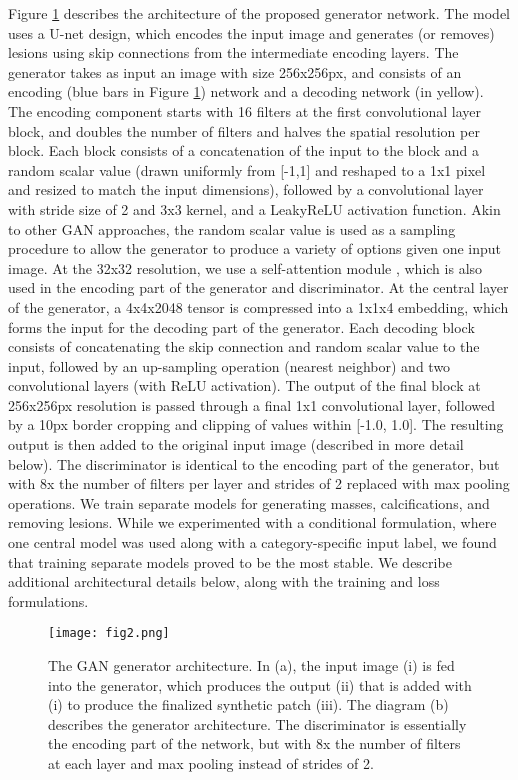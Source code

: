 \documentclass{article}
\begin{document}
Figure \ref{architecture} describes the architecture of the proposed generator network. The model uses a U-net \cite{unet} design, which encodes the input image and generates (or removes) lesions using skip connections from the intermediate encoding layers. The generator takes as input an image with size 256x256px, and consists of an encoding (blue bars in Figure \ref{architecture}) network and a decoding network (in yellow). The encoding component starts with 16 filters at the first convolutional layer block, and doubles the number of filters and halves the spatial resolution per block. Each block consists of a concatenation of the input to the block and a random scalar value (drawn uniformly from [-1,1] and reshaped to a 1x1 pixel and resized to match the input dimensions), followed by a convolutional layer with stride size of 2 and 3x3 kernel, and a LeakyReLU \cite{xu} activation function. Akin to other GAN approaches, the random scalar value is used as a sampling procedure to allow the generator to produce a variety of options given one input image. At the 32x32 resolution, we use a self-attention module \cite{sagan}, which is also used in the encoding part of the generator and discriminator. At the central layer of the generator, a 4x4x2048 tensor is compressed into a 1x1x4 embedding, which forms the input for the decoding part of the generator. Each decoding block consists of concatenating the skip connection and random scalar value to the input, followed by an up-sampling operation (nearest neighbor) and two convolutional layers (with ReLU activation). The output of the final block at 256x256px resolution is passed through a final 1x1 convolutional layer, followed by a 10px border cropping and clipping of values within [-1.0, 1.0]. The resulting output is then added to the original input image (described in more detail below). The discriminator is identical to the encoding part of the generator, but with 8x the number of filters per layer and strides of 2 replaced with max pooling operations. We train separate models for generating masses, calcifications, and removing lesions. While we experimented with a conditional formulation, where one central model was used along with a category-specific input label, we found that training separate models proved to be the most stable. We describe additional architectural details below, along with the training and loss formulations.
\\

\begin{figure}
\texttt{[image: fig2.png]}
\caption{The GAN generator architecture. In (a), the input image (i) is fed into the generator, which produces the output (ii) that is added with (i) to produce the finalized synthetic patch (iii). The diagram (b) describes the generator architecture. The discriminator is essentially the encoding part of the network, but with 8x the number of filters at each layer and max pooling instead of strides of 2.} \label{architecture}
\end{figure}
\end{document}
